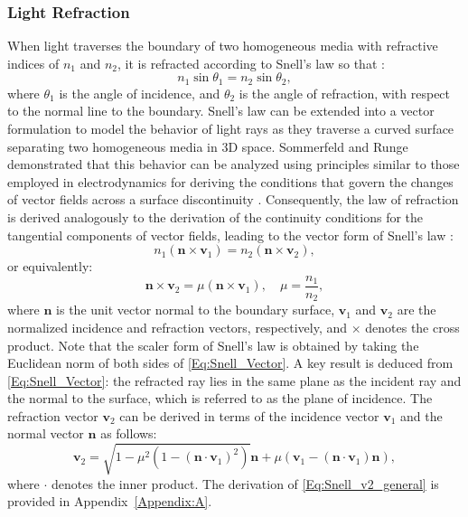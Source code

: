 \documentclass[lettersize,journal]{IEEEtran}
\begin{document}
\subsubsection{Light Refraction} When light traverses the boundary of two homogeneous media with refractive indices of $n_1$ and $n_2$, it is refracted according to Snell's law so that \cite[p.~7]{Saleh2019}:
%
\begin{equation}
n_1 \sin{\theta_1} = n_2\sin{\theta_2},
\label{Eq:Snell_Scalar}
\end{equation}
%
where $\theta_1$ is the angle of incidence, and $\theta_2$ is the angle of refraction, with respect to the normal line to the boundary. Snell's law can be extended into a vector formulation to model the behavior of light rays as they traverse a curved surface separating two homogeneous media in \ac{3D} space. Sommerfeld and Runge demonstrated that this behavior can be analyzed using principles similar to those employed in electrodynamics for deriving the conditions that govern the changes of vector fields across a surface discontinuity \cite{Sommerfeld1911Optics}. Consequently, the law of refraction is derived analogously to the derivation of the continuity conditions for the tangential components of vector fields, leading to the vector form of Snell's law \cite[p.~133]{Born2019Optics}:
%
\begin{equation}
n_1\left(\mathbf{n}\times\mathbf{v}_1\right) = n_2\left(\mathbf{n}\times\mathbf{v}_2\right),
\label{Eq:Snell_Vector}
\end{equation}
%
or equivalently:
\begin{equation}
\mathbf{n}\times\mathbf{v}_2 = \mu\left(\mathbf{n}\times\mathbf{v}_1\right), \quad \mu=\frac{n_1}{n_2},
\label{Eq:Law_of_Refraction}
\end{equation}
%
where $\mathbf{n}$ is the unit vector normal to the boundary surface, $\mathbf{v}_1$ and $\mathbf{v}_2$ are the normalized incidence and refraction vectors, respectively, and $\times$ denotes the cross product.
%
Note that the scaler form of Snell's law is obtained by taking the Euclidean norm of both sides of \eqref{Eq:Snell_Vector}. A key result is deduced from \eqref{Eq:Snell_Vector}: the refracted ray lies in the same plane as the incident ray and the normal to the surface, which is referred to as the plane of incidence. The refraction vector $\mathbf{v}_2$ can be derived in terms of the incidence vector $\mathbf{v}_1$ and the normal vector $\mathbf{n}$ as follows:
%
\begin{equation}
   \mathbf{v}_2 = \sqrt{1-\mu^2\left(1-\left(\mathbf{n}{\cdot}\mathbf{v}_1 \right)^2\right)}\mathbf{n}+\mu\left(\mathbf{v}_1-\left(\mathbf{n}{\cdot}\mathbf{v}_1\right)\mathbf{n}\right),
   \label{Eq:Snell_v2_general}
\end{equation}
%
where ${\cdot}$ denotes the inner product. The derivation of \eqref{Eq:Snell_v2_general} is provided in Appendix~\ref{Appendix:A}.
\end{document}
